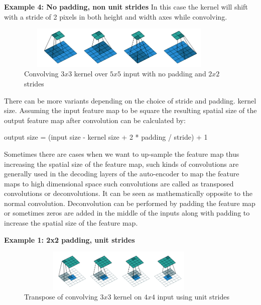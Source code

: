     
    \textbf{Example 4: No padding, non unit strides}
    In this case the kernel will shift with a stride of 2 pixels in both height and width axes while convolving. 
      \begin{figure}[h]
    \centering
    \includegraphics[width=10cm, height =2cm]{images/cnn_case5.png}
    \caption{Convolving $3x3$ kernel over $5x5$ input with no padding and $2x2$ strides \cite{https://doi.org/10.48550/arxiv.1603.07285}}
    \end{figure}
     
   There can be more variants depending on the choice of stride and padding. kernel size. Assuming the input feature map to be square the resulting spatial size of the output feature map after convolution can be calculated by:
   \begin{center}
      output size = (input size - kernel size + 2 * padding / stride) + 1
   \end{center}
   
   
   
   Sometimes there are cases when we want to up-sample the feature map thus increasing the spatial size of the feature map, such kinds of convolutions are generally used in the decoding layers of the auto-encoder to map the feature maps to high dimensional space such convolutions are called as transposed convolutions or deconvolutions. It can be seen as mathematically opposite to the normal convolution. Deconvolution can be performed by padding the feature map or sometimes zeros are added in the middle of the inputs along with padding to increase the spatial size of the feature map. \newline
  
    \textbf{Example 1:  2x2 padding,  unit strides}
     \begin{figure}[h]
    \centering
    \includegraphics[width=10cm, height =2cm]{images/tranpose_case1.png}
    \caption{ Transpose of convolving $3x3$ kernel on $4x4$ input using unit strides \cite{https://doi.org/10.48550/arxiv.1603.07285}}
    \end{figure}
    
